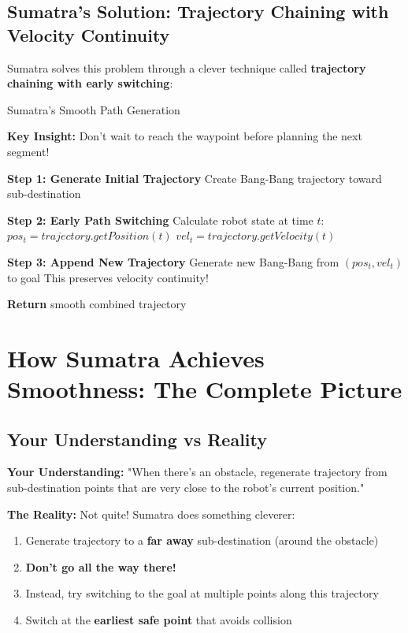\documentclass[12pt,a4paper]{article}
\begin{document}
\subsection{Sumatra's Solution: Trajectory Chaining with Velocity Continuity}

Sumatra solves this problem through a clever technique called \textbf{trajectory chaining with early switching}:

\begin{algorithm}
\caption{Sumatra's Smooth Path Generation}
\begin{algorithmic}
\STATE \textbf{Key Insight:} Don't wait to reach the waypoint before planning the next segment!

\STATE \textbf{Step 1: Generate Initial Trajectory}
\STATE Create Bang-Bang trajectory toward sub-destination

\STATE \textbf{Step 2: Early Path Switching}
    \STATE Calculate robot state at time $t$:
    \STATE $pos_t = trajectory.getPosition(t)$
    \STATE $vel_t = trajectory.getVelocity(t)$ 
    
    \STATE \textbf{Step 3: Append New Trajectory}
    \STATE Generate new Bang-Bang from $(pos_t, vel_t)$ to goal
    \STATE This preserves velocity continuity!
    
        \STATE \textbf{Return} smooth combined trajectory
    \ENDIF
\ENDFOR
\end{algorithmic}
\end{algorithm}

\section{How Sumatra Achieves Smoothness: The Complete Picture}

\subsection{Your Understanding vs Reality}

\textbf{Your Understanding:} "When there's an obstacle, regenerate trajectory from sub-destination points that are very close to the robot's current position."

\textbf{The Reality:} Not quite! Sumatra does something cleverer:

\begin{enumerate}
    \item Generate trajectory to a \textbf{far away} sub-destination (around the obstacle)
    \item \textbf{Don't go all the way there!}
    \item Instead, try switching to the goal at multiple points along this trajectory
    \item Switch at the \textbf{earliest safe point} that avoids collision
\end{enumerate}
\end{document}
